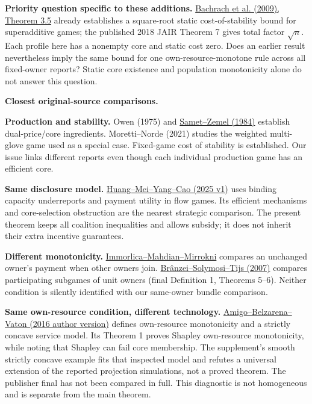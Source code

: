 \documentclass[11pt]{article}
\begin{document}
\textbf{Priority question specific to these additions.}
\href{https://arxiv.org/pdf/0907.4385}{Bachrach et al. (2009), Theorem 3.5}
already establishes a square-root static cost-of-stability bound for
superadditive games; the published 2018 JAIR Theorem 7 gives total factor
$\sqrt n$. Each profile here has a nonempty core and static cost
zero. Does an earlier result nevertheless imply the same bound for one
own-resource-monotone rule across all fixed-owner reports? Static core
existence and population monotonicity alone do not answer this question.

\newpage
\textbf{Closest original-source comparisons.}

\textbf{Production and stability.} Owen (1975) and
\href{https://www.tau.ac.il/~samet/papers/lp\%20games.pdf}{Samet--Zemel (1984)}
establish dual-price/core ingredients. Moretti--Norde (2021) studies the
weighted multi-glove game used as a special case. Fixed-game cost of
stability is established. Our issue links different reports even though
each individual production game has an efficient core.

\textbf{Same disclosure model.}
\href{https://arxiv.org/html/2502.08248v1}{Huang--Mei--Yang--Cao (2025 v1)}
uses binding capacity underreports and payment utility in flow games.
Its efficient mechanisms and core-selection obstruction are the nearest
strategic comparison. The present theorem keeps all coalition inequalities
and allows subsidy; it does not inherit their extra incentive guarantees.

\textbf{Different monotonicity.}
\href{https://immorlica.com/pubs/costshare.pdf}{Immorlica--Mahdian--Mirrokni}
compares an unchanged owner's payment when other owners join.
\href{https://doi.org/10.1007/s11750-007-0002-7}{Br\^anzei--Solymosi--Tijs (2007)}
compares participating subgames of unit owners (final Definition 1,
Theorems 5--6). Neither condition is silently identified with our
same-owner bundle comparison.

\textbf{Same own-resource condition, different technology.}
\href{https://hal.science/hal-01400498v1}{Amigo--Belzarena--Vaton (2016 author version)}
defines own-resource monotonicity and a strictly concave service model.
Its Theorem 1 proves Shapley own-resource monotonicity, while noting that
Shapley can fail core membership. The supplement's smooth strictly concave example fits that inspected model
and refutes a universal extension of the reported projection simulations,
not a proved theorem. The publisher final has not been compared in full.
This diagnostic is not homogeneous and is separate from the main theorem.
\end{document}
